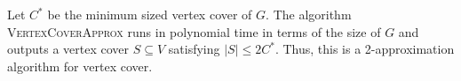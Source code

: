 \documentclass[11  pt]{article}
\begin{document}
	\newpage
	\begin{theorem}
		Let $C^*$ be the minimum sized vertex cover of $G$. The algorithm \textsc{VertexCoverApprox} runs in polynomial time in terms of the size of $G$ and outputs a vertex cover $S \subseteq V$ satisfying $|S| \leq 2C^*$. Thus, this is a 2-approximation algorithm for vertex cover.
	\end{theorem}


	
\end{document}
